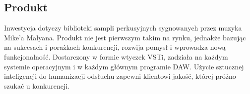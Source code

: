 \documentclass[12pt]{article}
\begin{document}





\subsection{Produkt}


Inwestycja dotyczy biblioteki sampli perkusyjnych sygnowanych przez muzyka Mike'a Malyana.
Produkt nie jest pierwszym takim na rynku, jednakże bazując na sukcesach i porażkach konkurencji, rozwija pomysł i wprowadza nową funkcjonalność.
Dostarczony w formie wtyczek VSTi, zadziała na każdym systemie operacyjnym i w każdym głównym programie DAW.
Użycie sztucznej inteligencji do humanizacji odsłuchu zapewni klientowi jakość, której próżno szukać u konkurencji.
\end{document}
